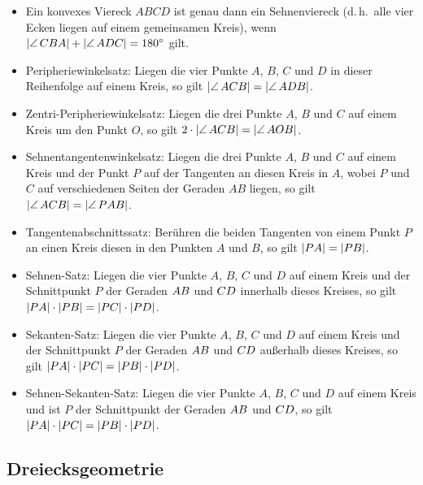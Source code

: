 \documentclass[11pt,a4paper]{article}
\begin{document}
\begin{itemize}
\item Ein konvexes Viereck $ABCD$ ist genau dann ein Sehnenviereck
  (d.\,h.\ alle vier Ecken liegen auf einem gemeinsamen Kreis), wenn
  $\mangle{CBA} + \mangle{ADC}=180\grad$ gilt.
\item Peripheriewinkelsatz: Liegen die vier Punkte $A$, $B$, $C$ und $D$ in
  dieser Reihenfolge auf einem Kreis, so gilt $\mangle{ACB}=\mangle{ADB}$.
\item Zentri-Peripheriewinkelsatz: Liegen die drei Punkte $A$, $B$ und $C$ auf
  einem Kreis um den Punkt $O$, so gilt $2\cdot\mangle{ACB}=\mangle{AOB}$.
\item Sehnentangentenwinkelsatz: Liegen die drei Punkte $A$, $B$ und $C$ auf
  einem Kreis und der Punkt $P$ auf der Tangenten an diesen Kreis in $A$,
  wobei $P$ und $C$ auf verschiedenen Seiten der Geraden $AB$ liegen, so gilt
  $\mangle{ACB}=\mangle{PAB}$.
\item Tangentenabschnittssatz: Berühren die beiden Tangenten von einem Punkt
  $P$ an einen Kreis diesen in den Punkten $A$ und $B$, so gilt
  $\left\vert {\mathnormal{PA}}\right\vert=\left\vert {\mathnormal{PB}}\right\vert$.
\item Sehnen-Satz: Liegen die vier Punkte $A$, $B$, $C$ und $D$ auf einem
  Kreis und der Schnittpunkt $P$ der Geraden ${\mathnormal{AB}}$ und ${\mathnormal{CD}}$
  innerhalb dieses Kreises, so gilt $\left\vert {\mathnormal{PA}}\right\vert\cdot \left\vert {\mathnormal{PB}}\right\vert
  =\left\vert {\mathnormal{PC}}\right\vert\cdot \left\vert {\mathnormal{PD}}\right\vert$.
\item Sekanten-Satz: Liegen die vier Punkte $A$, $B$, $C$ und $D$ auf einem
  Kreis und der Schnittpunkt $P$ der Geraden ${\mathnormal{AB}}$ und ${\mathnormal{CD}}$
  außerhalb dieses Kreises, so gilt $\left\vert {\mathnormal{PA}}\right\vert\cdot \left\vert {\mathnormal{PC}}\right\vert
  =\left\vert {\mathnormal{PB}}\right\vert\cdot \left\vert {\mathnormal{PD}}\right\vert$.
\item Sehnen-Sekanten-Satz: Liegen die vier Punkte $A$, $B$, $C$ und $D$ auf
  einem Kreis und ist $P$ der Schnittpunkt der Geraden ${\mathnormal{AB}}$ und
  ${\mathnormal{CD}}$, so gilt $\left\vert {\mathnormal{PA}}\right\vert\cdot \left\vert {\mathnormal{PC}}\right\vert =\left\vert {\mathnormal{PB}}\right\vert\cdot
  \left\vert {\mathnormal{PD}}\right\vert$.
\end{itemize}

\subsection{Dreiecksgeometrie}
\end{document}

